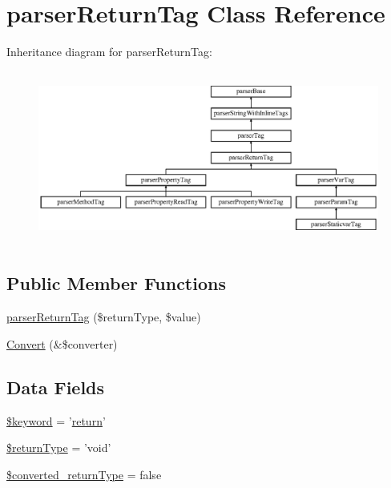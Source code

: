 \hypertarget{classparser_return_tag}{\section{parser\-Return\-Tag \-Class \-Reference}
\label{classparser_return_tag}
}
\-Inheritance diagram for parser\-Return\-Tag\-:\begin{figure}[H]
\begin{center}
\leavevmode
\includegraphics[height=5.730994cm]{classparser_return_tag}
\end{center}
\end{figure}
\subsection*{\-Public \-Member \-Functions}
\begin{DoxyCompactItemize}
\item 
\hyperlink{classparser_return_tag_a416176fea3236da61004d21c37b172d0}{parser\-Return\-Tag} (\$return\-Type, \$value)
\item 
\hyperlink{classparser_return_tag_a31e57fd66b58b300f8a489aa1b9431f6}{\-Convert} (\&\$converter)
\end{DoxyCompactItemize}
\subsection*{\-Data \-Fields}
\begin{DoxyCompactItemize}
\item 
\hyperlink{classparser_return_tag_a4a925d6b38bcf3957c713a7d3dc7da1f}{\$keyword} = '\hyperlink{find__phpdoc_8php_a9717e7bbecb906637e86cef6da3d83c2}{return}'
\item 
\hyperlink{classparser_return_tag_a0f317c2c1d4c617554890223a39037be}{\$return\-Type} = 'void'
\item 
\hyperlink{classparser_return_tag_a15683ef9d58ead6e8f6af3d7cc050bcd}{\$converted\-\_\-return\-Type} = false
\end{DoxyCompactItemize}


